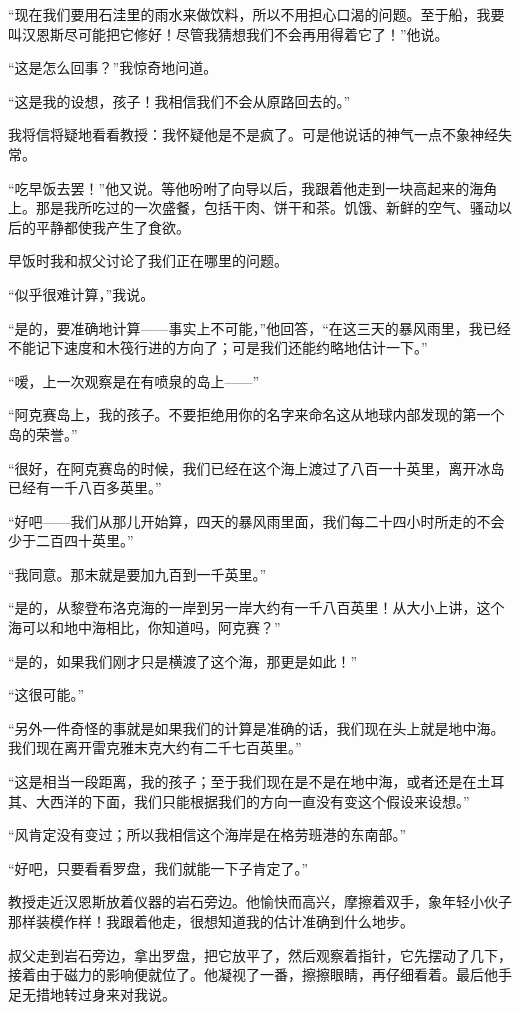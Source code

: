 \documentclass[10pt]{book}
\begin{document}
“现在我们要用石洼里的雨水来做饮料，所以不用担心口渴的问题。至于船，我要叫汉恩斯尽可能把它修好！尽管我猜想我们不会再用得着它了！”他说。

“这是怎么回事？”我惊奇地问道。

“这是我的设想，孩子！我相信我们不会从原路回去的。”

我将信将疑地看看教授：我怀疑他是不是疯了。可是他说话的神气一点不象神经失常。

“吃早饭去罢！”他又说。等他吩咐了向导以后，我跟着他走到一块高起来的海角上。那是我所吃过的一次盛餐，包括干肉、饼干和茶。饥饿、新鲜的空气、骚动以后的平静都使我产生了食欲。

早饭时我和叔父讨论了我们正在哪里的问题。

“似乎很难计算，”我说。

“是的，要准确地计算——事实上不可能，”他回答，“在这三天的暴风雨里，我已经不能记下速度和木筏行进的方向了；可是我们还能约略地估计一下。”

“嗳，上一次观察是在有喷泉的岛上——”

“阿克赛岛上，我的孩子。不要拒绝用你的名字来命名这从地球内部发现的第一个岛的荣誉。”

“很好，在阿克赛岛的时候，我们已经在这个海上渡过了八百一十英里，离开冰岛已经有一千八百多英里。”

“好吧——我们从那儿开始算，四天的暴风雨里面，我们每二十四小时所走的不会少于二百四十英里。”

“我同意。那末就是要加九百到一千英里。”

“是的，从黎登布洛克海的一岸到另一岸大约有一千八百英里！从大小上讲，这个海可以和地中海相比，你知道吗，阿克赛？”

“是的，如果我们刚才只是横渡了这个海，那更是如此！”

“这很可能。”

“另外一件奇怪的事就是如果我们的计算是准确的话，我们现在头上就是地中海。我们现在离开雷克雅末克大约有二千七百英里。”

“这是相当一段距离，我的孩子；至于我们现在是不是在地中海，或者还是在土耳其、大西洋的下面，我们只能根据我们的方向一直没有变这个假设来设想。”

“风肯定没有变过；所以我相信这个海岸是在格劳班港的东南部。”

“好吧，只要看看罗盘，我们就能一下子肯定了。”

教授走近汉恩斯放着仪器的岩石旁边。他愉快而高兴，摩擦着双手，象年轻小伙子那样装模作样！我跟着他走，很想知道我的估计准确到什么地步。

叔父走到岩石旁边，拿出罗盘，把它放平了，然后观察着指针，它先摆动了几下，接着由于磁力的影响便就位了。他凝视了一番，擦擦眼睛，再仔细看着。最后他手足无措地转过身来对我说。
\end{document}
